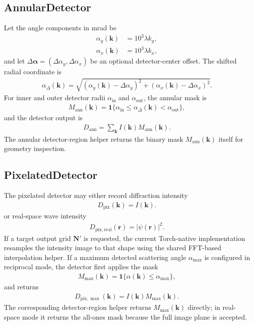\documentclass[11pt]{article}
\begin{document}
\subsection{AnnularDetector}
Let the angle components in mrad be
\begin{align}
  \alpha_y(\mathbf{k}) &= 10^3 \lambda k_y, \\
  \alpha_x(\mathbf{k}) &= 10^3 \lambda k_x,
\end{align}
and let $\Delta\boldsymbol{\alpha}=(\Delta\alpha_y,\Delta\alpha_x)$ be an optional
detector-center offset.  The shifted radial coordinate is
\begin{align}
  \alpha_\Delta(\mathbf{k})
  =
  \sqrt{
    \left(\alpha_y(\mathbf{k})-\Delta\alpha_y\right)^2
    +
    \left(\alpha_x(\mathbf{k})-\Delta\alpha_x\right)^2
  }.
\end{align}
For inner and outer detector radii $\alpha_{\mathrm{in}}$ and
$\alpha_{\mathrm{out}}$, the annular mask is
\begin{align}
  M_{\mathrm{ann}}(\mathbf{k})
  = \mathbf{1}\{
    \alpha_{\mathrm{in}} \le \alpha_\Delta(\mathbf{k}) < \alpha_{\mathrm{out}}
  \},
\end{align}
and the detector output is
\begin{align}
  D_{\mathrm{ann}}
  = \sum_{\mathbf{k}} I(\mathbf{k}) M_{\mathrm{ann}}(\mathbf{k}).
\end{align}
The annular detector-region helper returns the binary mask
$M_{\mathrm{ann}}(\mathbf{k})$ itself for geometry inspection.

\subsection{PixelatedDetector}
The pixelated detector may either record diffraction intensity
\begin{align}
  D_{\mathrm{pix}}(\mathbf{k}) = I(\mathbf{k}).
\end{align}
or real-space wave intensity
\begin{align}
  D_{\mathrm{pix,real}}(\mathbf{r}) = |\psi(\mathbf{r})|^2.
\end{align}
If a target output grid $\mathbf{N}'$ is requested, the current Torch-native
implementation resamples the intensity image to that shape using the shared FFT-based
interpolation helper.
If a maximum detected scattering angle $\alpha_{\max}$ is configured in reciprocal
mode, the detector first applies the mask
\begin{align}
  M_{\max}(\mathbf{k}) = \mathbf{1}\{\alpha(\mathbf{k}) \le \alpha_{\max}\},
\end{align}
and returns
\begin{align}
  D_{\mathrm{pix},\max}(\mathbf{k}) = I(\mathbf{k}) M_{\max}(\mathbf{k}).
\end{align}
The corresponding detector-region helper returns $M_{\max}(\mathbf{k})$ directly; in
real-space mode it returns the all-ones mask because the full image plane is accepted.
\end{document}
